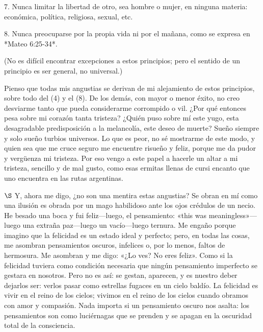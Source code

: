 \documentclass[a4paper, 12pt]{article}
\begin{document}
7. Nunca limitar la libertad de otro, sea hombre o mujer, en ninguna materia:
económica, política, religiosa, sexual, etc.

8. Nunca preocuparse por la propia vida ni por el mañana, como se expresa en
*Mateo 6:25-34*.


(No es difícil encontrar excepciones a estos principios; pero el sentido de un
principio es ser general, no universal.)

Pienso que todas mis angustias se derivan de mi alejamiento de estos principios,
sobre todo del (4) y el (8). De los demás, con mayor o menor éxito, no creo
desviarme tanto que pueda considerarme corrompido o vil. ¿Por qué entonces pesa
sobre mi corazón tanta tristeza? ¿Quién puso sobre mí este yugo, esta
desagradable predisposición a la melancolía, este deseo de muerte? Sueño siempre
y solo sueño turbios universos. Lo que es peor, no sé mostrarme de este modo, y
quien sea que me cruce seguro me encuentre risueño y feliz, porque me da pudor y
vergüenza mi tristeza. Por eso vengo a este papel a hacerle un altar a mi
tristeza, sencillo y de mal gusto, como esas ermitas llenas de cursi encanto que
uno encuentra en las rutas argentinas. 

\newpage 

$\S$ Y, ahora me digo, ¿no son una mentira estas angustias? Se obran en mí como
una ilusión es obrada por un mago habilidoso ante los ojos crédulos de un necio.
He besado una boca y fui feliz---luego, el pensamiento: «this was
meaningless»---luego una extraña paz---luego un vacío---luego ternura. Me engaño
porque imagino que la felicidad es un estado ideal y perfecto; pero, en todas
las cosas, me asombran pensamientos oscuros, infelices o, por lo menos, faltos
de hermosura. Me asombran y me digo: «¿Lo ves? No eres feliz». Como si la
felicidad tuviera como condición necesaria que ningún pensamiento imperfecto se
gestara en nosotros. Pero no es así: se gestan, aparecen, y es nuestro deber
dejarlos ser: verlos pasar como estrellas fugaces en un cielo baldío. La
felicidad es vivir en el reino de los cielos; vivimos en el reino de los cielos
cuando obramos con amor y compasión. Nada importa si un pensamiento oscuro nos
asalta: los pensamientos son como luciérnagas que se prenden y se apagan en la
oscuridad total de la consciencia.

~
\end{document}

